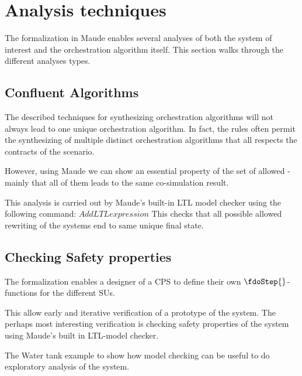 \section{Analysis techniques}\label{sc:casestudy}
The formalization in Maude enables several analyses of both the system of interest and the orchestration algorithm itself. 
This section walks through the different analyses types.

\subsection{Confluent Algorithms}
The described techniques for synthesizing orchestration algorithms will not always lead to one unique orchestration algorithm.
In fact, the rules often permit the synthesizing of multiple distinct orchestration algorithms that all respects the contracts of the scenario.

However, using Maude we can show an essential property of the set of allowed - mainly that all of them leads to the same co-simulation result.

This analysis is carried out by Maude's built-in LTL model checker using the following command:
$Add LTL expression$
This checks that all possible allowed rewriting of the systems end to same unique final state.

\subsection{Checking Safety properties}
The formalization enables a designer of a CPS to define their own $\fdoStep{}$-functions for the different SUs.  

This allow early and iterative verification of a prototype of the system. 
The perhaps most interesting verification is checking safety properties of the system using Maude's built in LTL-model checker. 

The Water tank example to show how model checking can be useful to do exploratory analysis of the system.
